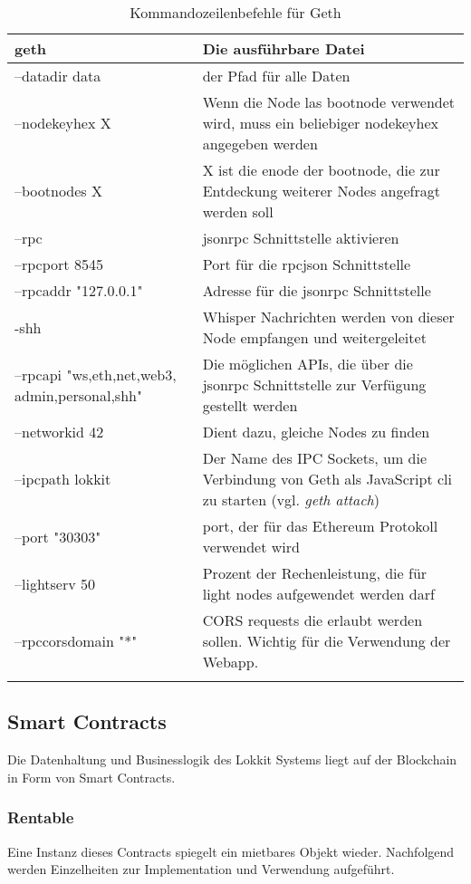\begin{table}[H]
\centering
\caption{Kommandozeilenbefehle für Geth\cite[Wiki/Management APIs]{go-ethereum}}
\label{tbl:geth cli}
\begin{tabular}{@{}L{4cm}L{10cm}@{}}
\toprule
geth & Die ausführbare Datei \\ \midrule
--datadir data & der Pfad für alle Daten \\ \midrule
--nodekeyhex X & Wenn die Node las bootnode verwendet wird, muss ein beliebiger nodekeyhex angegeben werden \\ \midrule
--bootnodes X & X ist die enode der bootnode, die zur Entdeckung weiterer Nodes angefragt werden soll \\ \midrule
--rpc & jsonrpc Schnittstelle aktivieren \\ \midrule
--rpcport 8545 & Port für die rpcjson Schnittstelle \\ \midrule
--rpcaddr "127.0.0.1" & Adresse für die jsonrpc Schnittstelle \\ \midrule
-shh & Whisper Nachrichten werden von dieser Node empfangen und weitergeleitet \\ \midrule
--rpcapi "ws,eth,net,web3, admin,personal,shh" & Die möglichen APIs, die über die jsonrpc Schnittstelle zur Verfügung gestellt werden \\ \midrule
--networkid 42 & Dient dazu, gleiche Nodes zu finden \\ \midrule
--ipcpath lokkit & Der Name des IPC Sockets, um die Verbindung von Geth als JavaScript cli zu starten (vgl. \emph{geth attach}) \\ \midrule
--port "30303" & port, der für das Ethereum Protokoll verwendet wird \\ \midrule
--lightserv 50 & Prozent der Rechenleistung, die für light nodes aufgewendet werden darf \\ \midrule
--rpccorsdomain "*" & CORS requests die erlaubt werden sollen. Wichtig für die Verwendung der Webapp. \\ \midrule
 \\ \bottomrule
\end{tabular}
\end{table}

\subsection{Smart Contracts}
Die Datenhaltung und Businesslogik des Lokkit Systems liegt auf der Blockchain in Form von Smart Contracts.
\subsubsection{Rentable}
\label{sys_subsubsec:Rentable}
Eine Instanz dieses Contracts spiegelt ein mietbares Objekt wieder. Nachfolgend werden Einzelheiten zur Implementation und Verwendung aufgeführt.

